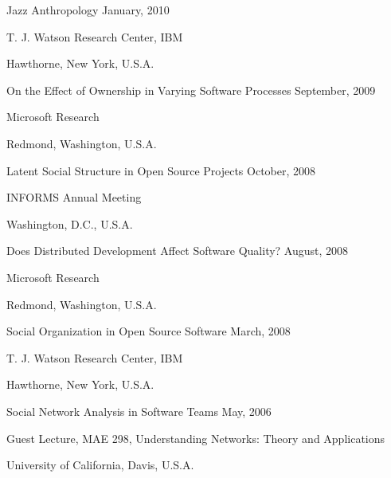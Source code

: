 \documentclass[margin,line,article,letterpaper]{res}
\newenvironment{list1}{
  \begin{list}{}{%
      \setlength{\itemsep}{0in}
      \setlength{\parsep}{0in} \setlength{\parskip}{0in}
      \setlength{\topsep}{0in} \setlength{\partopsep}{0in} 
      \setlength{\leftmargin}{0.17in}}}{\end{list}}
\newcommand{\timespan}[1]{#1}
\begin{document}
\begin{resume}
Jazz Anthropology \hfill \timespan{January, 2010}\\
\vspace{-10pt}
\begin{list1}
\item T. J. Watson Research Center, IBM
\item Hawthorne, New York, U.S.A.
\end{list1}

On the Effect of Ownership in Varying Software Processes \hfill \timespan{September, 2009}\\
\vspace{-10pt}
\begin{list1}
\item Microsoft Research
\item Redmond, Washington, U.S.A.
\end{list1}

Latent Social Structure in Open Source Projects \hfill \timespan{October, 2008}\\
\vspace{-10pt}
\begin{list1}
\item INFORMS Annual Meeting
\item Washington, D.C., U.S.A.
\end{list1}

Does Distributed Development Affect Software Quality? \hfill \timespan{August, 2008}\\
\vspace{-10pt}
\begin{list1}
\item Microsoft Research
\item Redmond, Washington, U.S.A.
\end{list1}

Social Organization in Open Source Software \hfill \timespan{March, 2008}\\
\vspace{-10pt}
\begin{list1}
\item T. J. Watson Research Center, IBM
\item Hawthorne, New York, U.S.A.
\end{list1}

Social Network Analysis in Software Teams \hfill \timespan{May, 2006}\\
\vspace{-10pt}
\begin{list1}
\item Guest Lecture, MAE 298, Understanding Networks: Theory and Applications
\item University of California, Davis, U.S.A.
\end{list1}


\end{resume}
\end{document}

